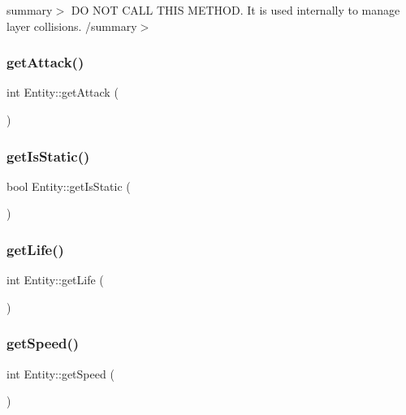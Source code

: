 summary$>$ DO N\+OT C\+A\+LL T\+H\+IS M\+E\+T\+H\+OD. It is used internally to manage layer collisions. /summary$>$ \mbox{\label{class_entity_aae036430d4de6fcb232a6eb998347f73}} 
\subsubsection{\texorpdfstring{get\+Attack()}{getAttack()}}
{\footnotesize\ttfamily int Entity\+::get\+Attack (\begin{DoxyParamCaption}{ }\end{DoxyParamCaption})\hspace{0.3cm}{\ttfamily [inline]}}

\mbox{\label{class_entity_a84a12847ce456de0ec4b361feca7ca5d}} 
\subsubsection{\texorpdfstring{get\+Is\+Static()}{getIsStatic()}}
{\footnotesize\ttfamily bool Entity\+::get\+Is\+Static (\begin{DoxyParamCaption}{ }\end{DoxyParamCaption})\hspace{0.3cm}{\ttfamily [inline]}}

\mbox{\label{class_entity_aa0cd265f3a18e6b48d1fe9ce6e7ebe88}} 
\subsubsection{\texorpdfstring{get\+Life()}{getLife()}}
{\footnotesize\ttfamily int Entity\+::get\+Life (\begin{DoxyParamCaption}{ }\end{DoxyParamCaption})\hspace{0.3cm}{\ttfamily [inline]}}

\mbox{\label{class_entity_a65f27075a95287e8c0f8f101498b3e84}} 
\subsubsection{\texorpdfstring{get\+Speed()}{getSpeed()}}
{\footnotesize\ttfamily int Entity\+::get\+Speed (\begin{DoxyParamCaption}{ }\end{DoxyParamCaption})\hspace{0.3cm}{\ttfamily [inline]}}

